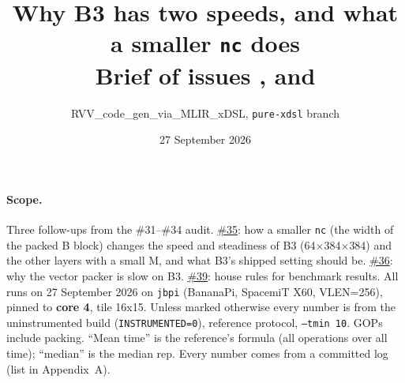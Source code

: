 \documentclass[10pt,a4paper]{article}
\title{\vspace{-1.2cm}\textbf{Why B3 has two speeds, and what a smaller \texttt{nc} does}\\[2pt]
\large Brief of issues \iss{35}, \iss{36} and \iss{39}}
\author{RVV\_code\_gen\_via\_MLIR\_xDSL, \texttt{pure-xdsl} branch}
\date{27 September 2026}
\newcommand{\iss}[1]{\href{https://github.com/JieGH/RVV_code_gen_via_MLIR_xDSL/issues/#1}{\##1}}
\begin{document}
\maketitle
\vspace{-0.8cm}

\paragraph{Scope.} Three follow-ups from the \#31--\#34 audit. \iss{35}: how a smaller \texttt{nc} (the width of
the packed B block) changes the speed and steadiness of B3 (64$\times$384$\times$384) and the other layers with a small
M, and what B3's shipped setting should be. \iss{36}: why the vector packer is slow on B3. \iss{39}: house rules for
benchmark results. All runs on 27 September 2026 on \texttt{jbpi} (BananaPi, SpacemiT X60, VLEN=256), pinned to
\textbf{core 4}, tile 16x15. Unless marked otherwise every number is from the uninstrumented build
(\texttt{INSTRUMENTED=0}), reference protocol, \texttt{--tmin 10}. GOPs include packing. ``Mean time'' is the
reference's formula (all operations over all time); ``median'' is the median rep. Every number comes from a
committed log (list in Appendix~A).
\end{document}
